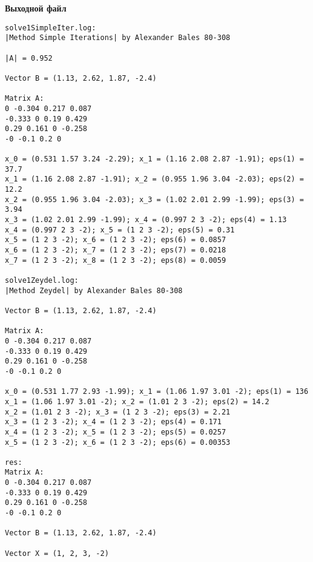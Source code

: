 \textbf{Выходной файл}
\begin{verbatim}
solve1SimpleIter.log:
|Method Simple Iterations| by Alexander Bales 80-308

|A| = 0.952

Vector B = (1.13, 2.62, 1.87, -2.4)

Matrix A:
0 -0.304 0.217 0.087 
-0.333 0 0.19 0.429 
0.29 0.161 0 -0.258 
-0 -0.1 0.2 0 

x_0 = (0.531 1.57 3.24 -2.29); x_1 = (1.16 2.08 2.87 -1.91); eps(1) = 37.7
x_1 = (1.16 2.08 2.87 -1.91); x_2 = (0.955 1.96 3.04 -2.03); eps(2) = 12.2
x_2 = (0.955 1.96 3.04 -2.03); x_3 = (1.02 2.01 2.99 -1.99); eps(3) = 3.94
x_3 = (1.02 2.01 2.99 -1.99); x_4 = (0.997 2 3 -2); eps(4) = 1.13
x_4 = (0.997 2 3 -2); x_5 = (1 2 3 -2); eps(5) = 0.31
x_5 = (1 2 3 -2); x_6 = (1 2 3 -2); eps(6) = 0.0857
x_6 = (1 2 3 -2); x_7 = (1 2 3 -2); eps(7) = 0.0218
x_7 = (1 2 3 -2); x_8 = (1 2 3 -2); eps(8) = 0.0059

solve1Zeydel.log:
|Method Zeydel| by Alexander Bales 80-308

Vector B = (1.13, 2.62, 1.87, -2.4)

Matrix A:
0 -0.304 0.217 0.087 
-0.333 0 0.19 0.429 
0.29 0.161 0 -0.258 
-0 -0.1 0.2 0 

x_0 = (0.531 1.77 2.93 -1.99); x_1 = (1.06 1.97 3.01 -2); eps(1) = 136
x_1 = (1.06 1.97 3.01 -2); x_2 = (1.01 2 3 -2); eps(2) = 14.2
x_2 = (1.01 2 3 -2); x_3 = (1 2 3 -2); eps(3) = 2.21
x_3 = (1 2 3 -2); x_4 = (1 2 3 -2); eps(4) = 0.171
x_4 = (1 2 3 -2); x_5 = (1 2 3 -2); eps(5) = 0.0257
x_5 = (1 2 3 -2); x_6 = (1 2 3 -2); eps(6) = 0.00353

res:
Matrix A:
0 -0.304 0.217 0.087 
-0.333 0 0.19 0.429 
0.29 0.161 0 -0.258 
-0 -0.1 0.2 0 

Vector B = (1.13, 2.62, 1.87, -2.4)

Vector X = (1, 2, 3, -2)
\end{verbatim}

\pagebreak
